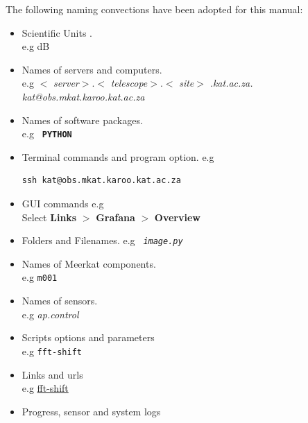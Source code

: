 \documentclass[12pt]{report}
\newcommand{\package}[1]{ \texttt{ \textbf{#1}}}
\newcommand{\server}[1]{ \textit{#1}}
\newcommand{\file}[1]{  \texttt{ \textit{#1}}}
\newcommand{\unit}[1]{ \textrm{#1}}
\newcommand{\component}[1]{  \texttt{#1}}
\newcommand{\sensor}[1]{  \textit{#1}}
\newcommand{\option}[1]{  \texttt{#1}}
\begin{document}
 The following naming convections have been adopted for this manual:  
 \begin{itemize}
 	\item {} Scientific Units \cite{unit}.\\
 	 e.g \unit{dB}
 	\item {} Names of servers and computers. \\
    e.g	$<$\server{server}$>$.$<$\server{telescope}$>.<$\server{site}$>$\server{.kat.ac.za.}\\
 	 \server{kat@obs.mkat.karoo.kat.ac.za} 
 	\item {} Names of software packages.\\
 	e.g  \package{PYTHON}
 		
 	\item {} Terminal commands and program option. 	 e.g 
 	\begin{lstlisting}[style=DOS, tabsize=4]
 	ssh kat@obs.mkat.karoo.kat.ac.za
 	\end{lstlisting}
 	\item {} GUI commands e.g\\
 	Select \textbf{Links} $>$ \textbf{Grafana}  $>$ \textbf{Overview}
 	\item {} Folders and Filenames. e.g \file{image.py}
 	\item{} Names of Meerkat components. \\ 
 	e.g \component{m001}
 	\item{} Names of sensors. \\
 	  e.g  \sensor{ap.control}
 	
 	\item{} Scripts options and parameters \\
 	e.g  \option{fft-shift}
 	\item{} Links and urls \\
 	e.g  \url{fft-shift}
 		\item{} Progress, sensor and system logs  \\
 \end{itemize}

 
% 
% 
% 
% 
% 
% 
% 
 
\end{document}
